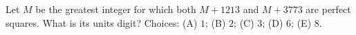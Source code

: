 Let $M$ be the greatest integer for which both $M+1213$ and $M+3773$ are perfect squares. What is its units digit? Choices: (A) $1$; (B) $2$; (C) $3$; (D) $6$; (E) $8$.
